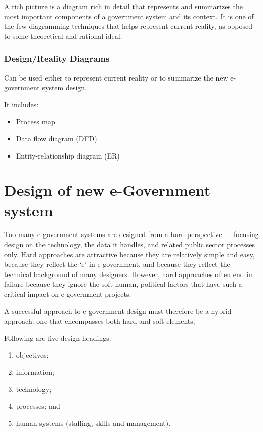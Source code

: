 A rich picture is a diagram rich in detail that
represents and summarizes the most important components of a government system
and its context. It is one of the few diagramming
techniques that helps represent current
reality, as opposed to some theoretical and
rational ideal.

\subsubsection*{Design/Reality Diagrams}
Can be used either to represent
current reality or to summarize the new
e-government system design.

It includes:

\begin{itemize}
	\item Process map
	\item Data flow diagram (DFD)
	\item Entity-relationship diagram (ER)
\end{itemize}



\section{Design of new e-Government system}
Too many e-government systems are
designed from a hard perspective — focusing
design on the technology, the data it
handles, and related public sector processes
only. Hard approaches are attractive because they are
relatively simple and easy, because they
reflect the ‘e’ in e-government, and because
they reflect the technical background of
many designers. However, hard approaches
often end in failure because they ignore the
soft human, political factors that have such
a critical impact on e-government projects.


A successful approach to e-government
design must therefore be a hybrid approach:
one that encompasses both hard and soft
elements; 

Following are five design headings:

\begin{multicols}{2}
	\begin{enumerate}
		\item objectives;
		\item information;
		\item technology;
		\item processes; and
		\item human systems (staffing, skills and management).
	\end{enumerate}
	
\end{multicols}


